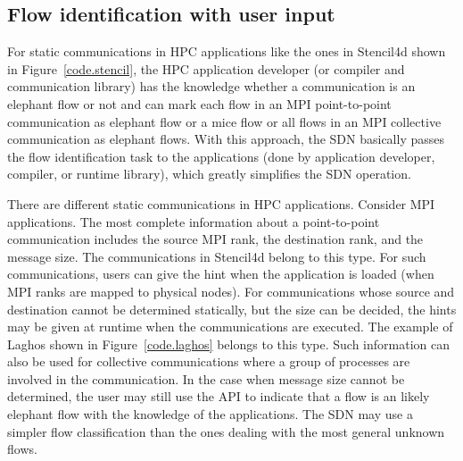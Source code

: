 \subsection{Flow identification with user input}

For static communications in HPC applications like the ones in Stencil4d
shown in Figure~\ref{code.stencil}, the HPC application developer (or
compiler and communication library) has
the knowledge whether a communication is an
elephant flow or not and can mark each flow in an MPI point-to-point
communication as elephant flow or a mice flow or all flows in an
MPI collective communication as elephant flows.
With this approach, the SDN basically passes the flow identification
task to the applications (done by application developer, compiler, or
runtime library), which greatly simplifies the SDN operation.

There are different static communications in HPC applications. Consider
MPI applications. The most complete information about a point-to-point
communication includes the source MPI rank, the destination rank, and the
message size. The communications in Stencil4d belong to this type. 
For such communications, users can give the hint when the
application is loaded (when MPI ranks are mapped to physical nodes).
For communications whose source and destination cannot be determined
statically, but the size can be decided, the hints may be given at runtime
when the communications are executed.
The example of Laghos shown in Figure~\ref{code.laghos} belongs to this type. 
Such information can also be used
for collective communications where a group of processes are involved in
the communication.
In the case when message size cannot be determined, the user may still use the
API to indicate that a flow is an likely
elephant flow with the knowledge of the applications. The SDN may use a
simpler flow classification than the ones dealing with the most general
unknown flows.
 
